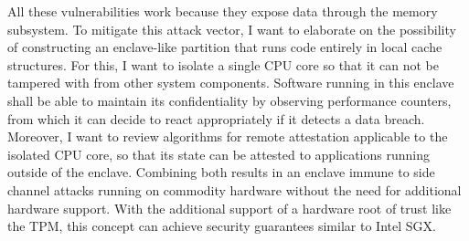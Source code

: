 All these vulnerabilities work because they expose data through the memory
subsystem. To mitigate this attack vector, I want to elaborate on the
possibility of constructing an enclave-like partition that runs code entirely in
local cache structures. For this, I want to isolate a single CPU core so that it
can not be tampered with from other system components. Software running in this
enclave shall be able to maintain its confidentiality by observing performance
counters, from which it can decide to react appropriately if it detects a data
breach. Moreover, I want to review algorithms for remote attestation applicable
to the isolated CPU core, so that its state can be attested to applications
running outside of the enclave. Combining both results in an enclave immune to
side channel attacks running on commodity hardware without the need for
additional hardware support. With the additional support of a hardware root of
trust like the TPM, this concept can achieve security guarantees similar to
Intel SGX.




